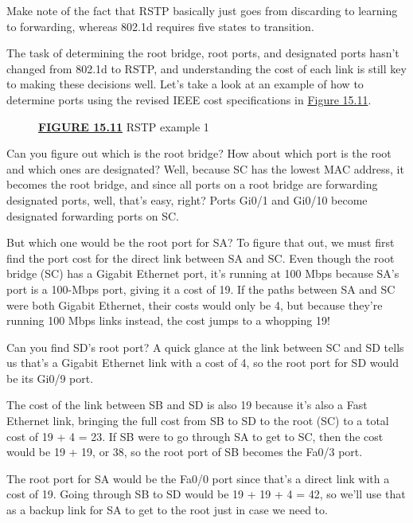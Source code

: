 \documentclass[b5paper,11pt]{memoir}
\begin{document}
Make note of the fact that RSTP basically just goes from discarding to
learning to forwarding, whereas 802.1d requires five states to
transition.

The task of determining the root bridge, root ports, and designated
ports hasn't changed from 802.1d to RSTP, and understanding the cost of
each link is still key to making these decisions well. Let's take a look
at an example of how to determine ports using the revised IEEE cost
specifications in
\protect\hyperlink{c15.xhtmlux5cux23figure15-11}{Figure 15.11}.

\begin{figure}
\centering
\caption{{\protect\hyperlink{c15.xhtmlux5cux23figureanchor15-11}{\textbf{FIGURE
15.11}} RSTP example 1}}
\end{figure}

Can you figure out which is the root bridge? How about which port is the
root and which ones are designated? Well, because SC has the lowest MAC
address, it becomes the root bridge, and since all ports on a root
bridge are forwarding designated ports, well, that's easy, right? Ports
Gi0/1 and Gi0/10 become designated forwarding ports on SC.

But which one would be the root port for SA? To figure that out, we must
first find the port cost for the direct link between SA and SC. Even
though the root bridge (SC) has a Gigabit Ethernet port, it's running at
100 Mbps because SA's port is a 100-Mbps port, giving it a cost of 19.
If the paths between SA and SC were both Gigabit Ethernet, their
costs would only be
4, but because they're running 100 Mbps links instead, the cost jumps to
a whopping 19!

Can you find SD's root port? A quick glance at the link between SC and
SD tells us that's a Gigabit Ethernet link with a cost of 4, so the root
port for SD would be its Gi0/9 port.

The cost of the link between SB and SD is also 19 because it's also a
Fast Ethernet link, bringing the full cost from SB to SD to the root
(SC) to a total cost of 19 + 4 = 23. If SB were to go through SA to get
to SC, then the cost would be 19 + 19, or 38, so the root port of SB
becomes the Fa0/3 port.

The root port for SA would be the Fa0/0 port since that's a direct link
with a cost of 19. Going through SB to SD would be 19 + 19 + 4 = 42, so
we'll use that as a backup link for SA to get to the root just in case
we need to.
\end{document}
